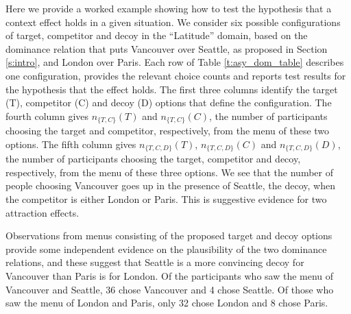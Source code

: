 \documentclass[11pt,letter]{article}
\newcommand{\menu}{menu}
\begin{document}
\begin{table}
  
  \caption{Data and test results for six candidate attraction effects in the Latitude domain. Each row gives a configuration of target, competitor and decoy options where we might expect an attraction effect. The fourth column gives the numbers of participants choosing the target and competitor when the menu is this pair of options. The fifth column gives the numbers of participants choosing the target, competitor and decoy when the menu is the set of these three options. The inconsistent but compact notation in the 4th and 5th column names is used only here.
  The sixth column gives the posterior probability of the hypothesis that the attraction effect holds. The last two columns give the Bayes factor and log Bayes factor in favour of the hypothesis that the attraction effect holds.}
  \label{t:asy_dom_table}
\end{table}

Here we provide a worked example showing how to test the hypothesis that a context effect holds in a given situation.
We consider six possible configurations of target, competitor and decoy in the ``Latitude'' domain, based on the dominance relation that puts Vancouver over Seattle, as proposed in Section \ref{s:intro}, and London over Paris.
Each row of Table \ref{t:asy_dom_table} describes one configuration, provides the relevant choice counts and reports test results for the hypothesis that the effect holds.
The first three columns identify the target (T), competitor (C) and decoy (D) options that define the configuration.
The fourth column gives $n_{\{T,C\}}(T)$ and $n_{\{T,C\}}(C)$, the number of participants choosing the target and competitor, respectively, from the \menu{} of these two options.
The fifth column gives $n_{\{T,C,D\}}(T)$, $n_{\{T,C,D\}}(C)$ and $n_{\{T,C,D\}}(D)$, the number of participants choosing the target, competitor and decoy, respectively, from the \menu{} of these three options.
We see that the number of people choosing Vancouver goes up in the presence of Seattle, the decoy, when the competitor is either London or Paris.
This is suggestive evidence for two attraction effects.

Observations from menus consisting of the proposed target and decoy options provide some independent evidence on the plausibility of the two dominance relations, and these suggest that Seattle is a more convincing decoy for Vancouver than Paris is for London.
Of the participants who saw the menu of Vancouver and Seattle, 36 chose Vancouver and 4 chose Seattle.
Of those who saw the menu of London and Paris, only 32 chose London and 8 chose Paris.
\end{document}
